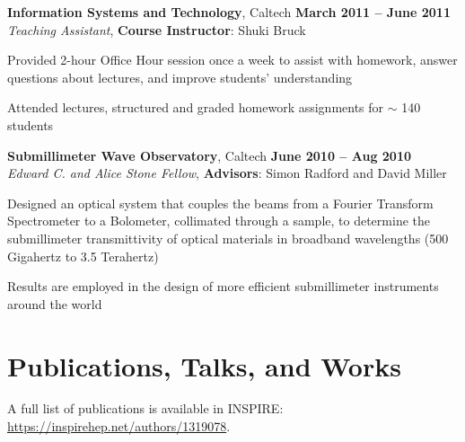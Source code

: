 \documentclass[margin,line]{resume}
\let\origsection\section%
\let\section\subsection%
\let\section\origsection%
\begin{document}
\begin{resume}
\textbf{Information Systems and Technology}, Caltech \hfill \textbf{March 2011 -- June 2011}\\
\textsl{Teaching Assistant}, \textbf{Course Instructor}: Shuki Bruck
\begin{list2}
  \item Provided 2-hour Office Hour session once a week to assist with homework, answer questions about lectures, and improve students' understanding
  \item Attended lectures, structured and graded homework assignments for $\sim$ 140 students
\end{list2}

\textbf{Submillimeter Wave Observatory}, Caltech \hfill \textbf{June 2010 -- Aug 2010}\\
\textsl{Edward C. and Alice Stone Fellow}, \textbf{Advisors}: Simon Radford and David Miller
\begin{list2}
  \item Designed an optical system that couples the beams from a Fourier Transform Spectrometer to a Bolometer, collimated through a sample, to determine the submillimeter transmittivity of optical materials in broadband wavelengths (500 Gigahertz to 3.5 Terahertz)
  \item Results are employed in the design of more efficient submillimeter instruments around the world
\end{list2}


\section{\mysidestyle Publications, Talks, and Works}

A full list of publications is available in INSPIRE: \url{https://inspirehep.net/authors/1319078}.


\end{resume}
\end{document}
